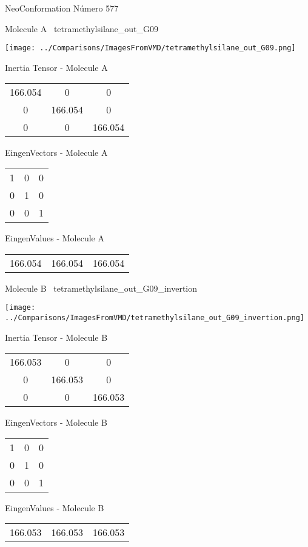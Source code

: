 \vtab[-3cm]
\begin{center}
{\large NeoConformation \tab Número 577}
\end{center}
\begin{multicols}{2}
\begin{center}

Molecule A \
tetramethylsilane\_out\_G09

\texttt{[image: ../Comparisons/ImagesFromVMD/tetramethylsilane\_out\_G09.png]}

Inertia Tensor - Molecule A \\
\begin{tabular}{|c c c|}
166.054	 & 	0	 & 	0	 \\
0	 & 	166.054	 & 	0	 \\
0	 & 	0	 & 	166.054
\end{tabular}

\vtab
 EingenVectors - Molecule A     \\
\begin{tabular}{|c c c|}
1	 & 	0	 & 	0	 \\
0	 & 	1	 & 	0	 \\
0	 & 	0	 & 	1
\end{tabular}

\vtab
 EingenValues - Molecule A     \\
\begin{tabular}{|c c c|}
166.054	 & 	166.054	 & 	166.054	 \\
\end{tabular}
\columnbreak

Molecule B \
tetramethylsilane\_out\_G09\_invertion

\texttt{[image: ../Comparisons/ImagesFromVMD/tetramethylsilane\_out\_G09\_invertion.png]}

Inertia Tensor - Molecule B \\
\begin{tabular}{|c c c|}
166.053	 & 	0	 & 	0	 \\
0	 & 	166.053	 & 	0	 \\
0	 & 	0	 & 	166.053
\end{tabular}

\vtab
 EingenVectors - Molecule B     \\
\begin{tabular}{|c c c|}
1	 & 	0	 & 	0	 \\
0	 & 	1	 & 	0	 \\
0	 & 	0	 & 	1
\end{tabular}

\vtab
 EingenValues - Molecule B     \\
\begin{tabular}{|c c c|}
166.053	 & 	166.053	 & 	166.053	 \\
\end{tabular}

\end{center}
\end{multicols}

